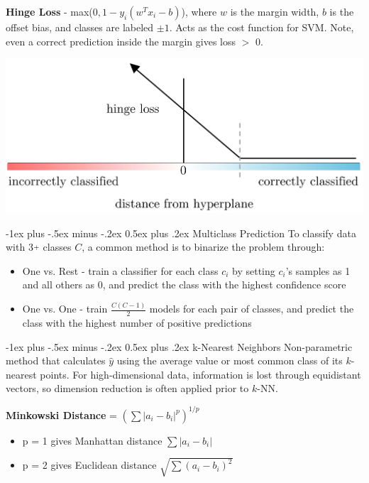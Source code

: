 \documentclass[10pt,landscape]{article}
\makeatletter
\newcommand{\plus}{\raisebox{.3\height}{\scalebox{.7}{+}}}
\renewcommand{\section}{\@startsection{section}{1}{0mm}%
                                {-1ex plus -.5ex minus -.2ex}%
                                {0.5ex plus .2ex}%
                                {\normalfont\large\bfseries}}
\renewcommand{\subsection}{\@startsection{subsection}{2}{0mm}%
                                {-1ex plus -.5ex minus -.2ex}%
                                {0.5ex plus .2ex}%
                                {\normalfont\normalsize\bfseries}}
\makeatother
\begin{document}
\begin{multicols}{3}
\textbf{Hinge Loss} - max($0,1-y_i(w^T x_i - b)$), where
$w$ is the margin width, $b$ is the offset bias, and classes are labeled $\pm1$. Acts as the cost function for SVM. Note, even a correct prediction inside the margin gives loss $>$ 0.
\vspace{-1mm}
\begin{center}
    \includegraphics[scale = .105]{images/hingeloss3.JPG}
\end{center}
\vspace{-3.5mm}
\subsection{Multiclass Prediction}
To classify data with 3$\plus$ classes $C$, a common method is to binarize the problem through:
\begin{itemize}[label={--},leftmargin=4mm]
\vspace{-1mm}
\itemsep -.4mm
\item One vs. Rest - train a classifier for each class $c_i$ by setting $c_i$'s samples as 1 and all others as 0, and predict the class with the highest confidence score
\item One vs. One - train $\frac{C (C-1)}{2}$ models for each pair of classes, and predict the class with the highest number of positive predictions
\end{itemize}

\section{k-Nearest Neighbors}
Non-parametric method that calculates $\hat{y}$ using the average value or most common class of its $k$-nearest points. For high-dimensional data, information is lost through equidistant vectors, so dimension reduction is often applied prior to $k$-NN.

\textbf{Minkowski Distance} = $(\sum|a_i - b_i|^p)^{1/p}$
\begin{itemize}[label={--},leftmargin=4mm]
\itemsep -.4mm
\item p = 1 gives Manhattan distance ${\sum|a_i - b_i|}$
\item p = 2 gives Euclidean distance $\sqrt{\sum(a_i - b_i)^2}$
\end{itemize}


\end{multicols}
\end{document}
